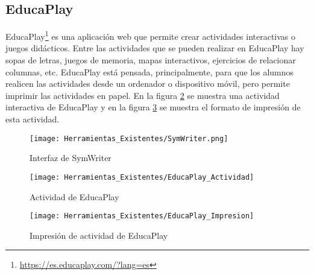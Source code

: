 \subsection{EducaPlay}
EducaPlay\footnote{\url{https://es.educaplay.com/?lang=es}} es una aplicación web que permite crear actividades interactivas o juegos didácticos. Entre las actividades que se pueden realizar en EducaPlay hay sopas de letras, juegos de memoria, mapas interactivos, ejercicios de relacionar columnas, etc. EducaPlay está pensada, principalmente, para que los alumnos realicen las actividades desde un ordenador o dispositivo móvil, pero permite imprimir las actividades en papel. En la figura \ref{fig:EducaPlay_Actividad} se muestra una actividad interactiva de EducaPlay y en la figura \ref{fig:EducaPlay_Impresion} se muestra el formato de impresión de esta actividad.


\begin{figure}[h!]
    \centering
    \texttt{[image: Herramientas\_Existentes/SymWriter.png]}
    \caption{Interfaz de SymWriter}
    \label{fig:SymWriter}
\end{figure}

\begin{figure}[h!]
    \centering
    \texttt{[image: Herramientas\_Existentes/EducaPlay\_Actividad]}
    \caption{Actividad de EducaPlay}
    \label{fig:EducaPlay_Actividad}
\end{figure}

\begin{figure}[h!]
    \centering
    \texttt{[image: Herramientas\_Existentes/EducaPlay\_Impresion]}
    \caption{Impresión de actividad de EducaPlay}
    \label{fig:EducaPlay_Impresion}
\end{figure}

